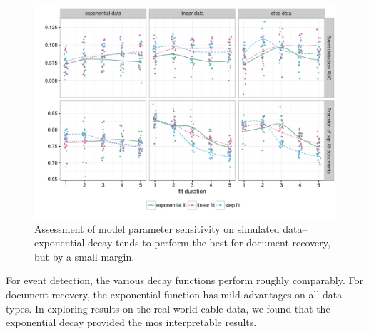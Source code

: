 \begin{figure}[th]
\centering
\includegraphics[width=\linewidth]{fig/sim_sensitivity.pdf}
\caption{Assessment of model parameter sensitivity on simulated data--exponential decay tends to perform the best for document recovery, but by a small margin.}
\label{fig:sensitivity}
\end{figure}

For event detection, the various decay functions perform roughly comparably.  For document recovery, the exponential function has mild advantages on all data types.  In exploring results on the real-world cable data, we found that the exponential decay provided the mos interpretable results.




